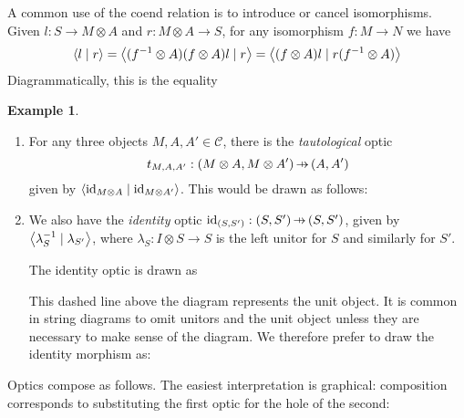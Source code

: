 \documentclass[11pt,letterpaper]{article}
\theoremstyle{plain}
\theoremstyle{definition}
\newtheorem{example}[theorem]{Example}
\newcommand{\C}{\mathscr{C}}
\newcommand{\id}{\mathrm{id}}
\newcommand{\rep}[2]{{\ensuremath \left\langle #1 \mid #2 \right\rangle}}
\newcommand{\hto}{\ensuremath{\,\mathaccent\shortmid\rightarrow\,}}
\begin{document}
A common use of the coend relation is to introduce or cancel isomorphisms. Given $l : S \to M \otimes A$ and $r : M \otimes A \to S$, for any isomorphism $f : M \to N$ we have
\begin{align*}
\rep{l}{r} = \rep{(f^{-1} \otimes A)(f \otimes A)l}{r} = \rep{(f \otimes A)l}{r(f^{-1} \otimes A)}
\end{align*}
Diagrammatically, this is the equality
  \begin{center}
    
    \hspace{0.8cm} \raisebox{1.5cm}{$=$} \hspace{1cm}
    
  \end{center}
  
  \begin{example}
  ~\begin{enumerate}[(1)]
  \item  For any three objects $M, A, A' \in \C$, there is the \emph{tautological} optic \[t_{M,A,A'} : (M \otimes A, M \otimes A') \hto (A, A')\] given by $\rep{\id_{M \otimes A}}{\id_{M \otimes A'}}$.
  This would be drawn as follows:
  \begin{center}
  
  \end{center}
  
  \item We also have the \emph{identity} optic $\id_{(S, S')} : (S, S') \hto (S, S')$, given by $\rep{\lambda^{-1}_S}{\lambda_{S'}}$, where $\lambda_S : I \otimes S \to S$ is the left unitor for $S$ and similarly for $S'$.

The identity optic is drawn as
\begin{center}
  
\end{center}
This dashed line above the diagram represents the unit object. It is common in string diagrams to omit unitors and the unit object unless they are necessary to make sense of the diagram. We therefore prefer to draw the identity morphism as:
\begin{center}
  
\end{center}
  \end{enumerate}
\end{example}

Optics compose as follows. The easiest interpretation is graphical: composition corresponds to substituting the first optic for the hole of the second:
\begin{center}
  
  \hspace{0.9cm} \raisebox{1.5cm}{$\circ$} \hspace{1cm}
   \\
  \raisebox{1.5cm}{$:=$}\qquad
  
\end{center}
\end{document}
